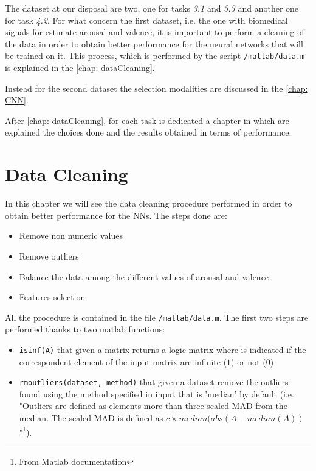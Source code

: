 \documentclass[a4paper]{report}
\begin{document}
	\noindent The dataset at our disposal are two, one for tasks \textit{3.1} and \textit{3.3} and another one for task \textit{4.2}.
	\noindent For what concern the first dataset, i.e. the one with biomedical signals for estimate arousal and valence, it is important to perform a cleaning of the data in order to obtain better performance for the neural networks that will be trained on it. This process, which is performed by the script \texttt{/matlab/data.m} is explained in the \autoref{chap: dataCleaning}. 
	
	\noindent Instead for the second dataset the selection modalities are discussed in the \autoref{chap: CNN}.
	
	\noindent After \autoref{chap: dataCleaning}, for each task is dedicated a chapter in which are explained the choices done and the results obtained in terms of performance.
	
\chapter{Data Cleaning}
	\label{chap: dataCleaning}
	\noindent In this chapter we will see the data cleaning procedure performed in order to obtain better performance for the NNs. The steps done are:
	\begin{itemize}
		\item Remove non numeric values
		\item Remove outliers
		\item Balance the data among the different values of arousal and valence
		\item Features selection
	\end{itemize}
	\noindent All the procedure is contained in the file \texttt{/matlab/data.m}. The first two steps are performed thanks to two matlab functions:
	\begin{itemize}
		\item \texttt{isinf(A)} that given a matrix returns a logic matrix where is indicated if the correspondent element of the input matrix are infinite ($1$) or not ($0$) 
		
		\item \texttt{rmoutliers(dataset, method)} that given a dataset remove the outliers found using the method specified in input that is 'median' by default (i.e. "Outliers are defined as elements more than three scaled MAD from the median. The scaled MAD is defined as $c\times median(abs(A-median(A))$"\footnote{From Matlab documentation}).
	\end{itemize} 
	
\end{document}

